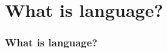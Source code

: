 \documentclass{beamer}
\begin{document}
\section{What is language?}

\begin{frame}
\frametitle{What is language?}
\end{frame}
\end{document}
